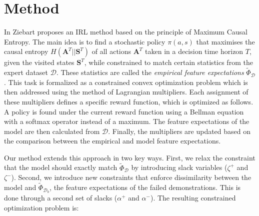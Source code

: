 \documentclass[conference]{IEEEtran}
\begin{document}
\section{Method}
In \cite{ziebart2010modelingthesis} Ziebart proposes an IRL method based on the principle of Maximum Causal Entropy.  The main idea is to find a stochastic policy $\pi(a,s)$ that maximises the causal entropy $H(\mathbf{A}^T||\mathbf{S}^T)$ of all actions $\mathbf{A}^T$ taken in a decision time horizon $T$, given the visited states $\mathbf{S}^T$, while constrained to match certain statistics from the expert dataset $\mathcal{D}$. These statistics are called the \emph{empirical feature expectations} $\widetilde{\Phi}_{\mathcal{D}}$. This task is formalized as a constrained convex optimization problem which is then addressed using the method of Lagrangian multipliers.  
%
Each assignment of these multipliers defines a specific reward function, which is optimized as follows. A policy is found under the current reward function using a Bellman equation with a softmax operator instead of a maximum.  The feature expectations of the model are then calculated from $\mathcal{D}$. Finally, the multipliers are updated based on the comparison between the empirical and model feature expectations.

Our method extends this approach in two key ways. First, we relax the constraint that the model should exactly match $\widetilde{\Phi}_{\mathcal{D}}$ by introducing slack variables ($\zeta^+$ and $\zeta^-$).  Second, we introduce new constraints that enforce dissimilarity between the model and $\widetilde{\Phi}_{\mathcal{D}_b}$, the feature expectations of the failed demonstrations. This is done through a second set of slacks ($\alpha^+$ and $\alpha^-$). The resulting constrained optimization problem is:
	
\end{document}
